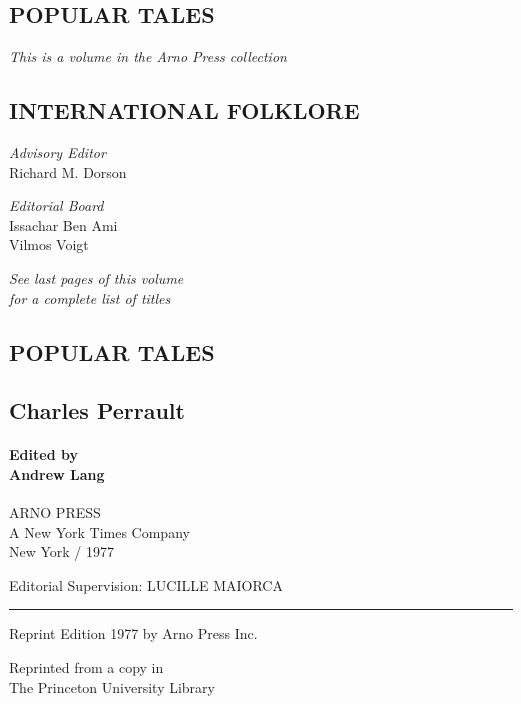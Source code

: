 \documentclass[14pt,a4paper]{memoir}
\begin{document}
\subsection{POPULAR TALES}

\emph{This is a volume in the Arno Press collection}

\subsection{INTERNATIONAL FOLKLORE}

\emph{Advisory Editor}\\
Richard M. Dorson

\emph{Editorial Board}\\
Issachar Ben Ami\\
Vilmos Voigt

\emph{See last pages of this volume\\
for a complete list of titles}

\subsection{POPULAR TALES}

\subsection{Charles Perrault}

\paragraph{\texorpdfstring{Edited by\\ Andrew Lang}{Edited by Andrew Lang}}


ARNO PRESS\\
A New York Times Company\\
New York / 1977

Editorial Supervision: LUCILLE MAIORCA

\begin{center}\rule{0.5\linewidth}{0.5pt}\end{center}

Reprint Edition 1977 by Arno Press Inc.

Reprinted from a copy in\\
\hspace*{0.333em}\hspace*{0.333em}\hspace*{0.333em}\hspace*{0.333em}The
Princeton University Library
\end{document}
